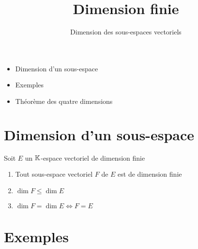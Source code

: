 

   





\title{{\bf Dimension finie}}
\subtitle{Dimension des sous-espaces vectoriels}

\begin{frame}
  
  \debutmontitre

  \pause

{\footnotesize
\hfill
{}
\begin{minipage}{0.6\textwidth}
  \begin{itemize}
    \item<3-> Dimension d'un sous-espace
    \item<4-> Exemples
    \item<5-> Théorème des quatre dimensions
  \end{itemize}
\end{minipage}
}

\end{frame}

\setcounter{framenumber}{0}


\section{Dimension d'un sous-espace}

\begin{frame}
Soit $E$ un $\mathbb{K}$-espace vectoriel de dimension finie
\pause
\begin{theoreme}
\begin{enumerate}
  \item Tout sous-espace vectoriel $F$ de $E$ est de dimension finie 
  \pause
  \item $\dim F \le \dim E$ 
  \pause
  \item $\dim F = \dim E \iff F=E$
\end{enumerate}
\end{theoreme}


\end{frame}




\section{Exemples}

